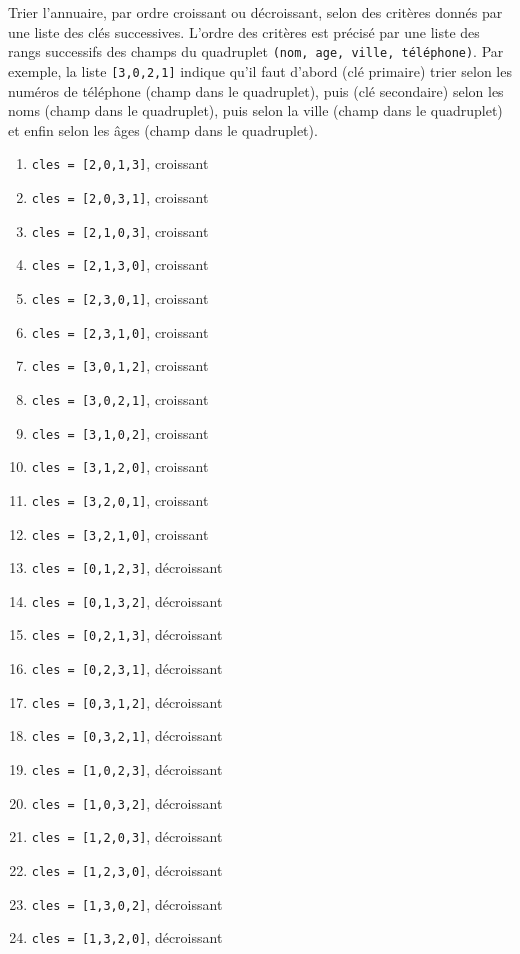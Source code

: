 Trier l'annuaire, par ordre croissant ou décroissant, selon des critères donnés 
par une liste des clés successives. 
L'ordre des critères est précisé par une liste des rangs successifs des champs du quadruplet
\texttt{(nom, age, ville, téléphone)}. Par exemple, la liste \texttt{[3,0,2,1]} indique
qu'il faut d'abord (clé primaire) trier selon les numéros de téléphone (champ  dans le quadruplet), puis (clé secondaire) selon les noms (champ  dans le quadruplet), 
puis selon la ville (champ  dans le quadruplet) et enfin selon les âges 
(champ  dans le quadruplet).

\noindent
\begin{minipage}[t]{7cm}
\begin{enumerate}
\item \texttt{cles = [2,0,1,3]}, croissant
\item \texttt{cles = [2,0,3,1]}, croissant
\item \texttt{cles = [2,1,0,3]}, croissant
\item \texttt{cles = [2,1,3,0]}, croissant
\item \texttt{cles = [2,3,0,1]}, croissant
\item \texttt{cles = [2,3,1,0]}, croissant
\item \texttt{cles = [3,0,1,2]}, croissant
\item \texttt{cles = [3,0,2,1]}, croissant
\item \texttt{cles = [3,1,0,2]}, croissant
\item \texttt{cles = [3,1,2,0]}, croissant
\item \texttt{cles = [3,2,0,1]}, croissant
\item \texttt{cles = [3,2,1,0]}, croissant
\end{enumerate}
\end{minipage}
\hfill
\begin{minipage}[t]{7cm}
\begin{enumerate}\setcounter{enumi}{12}
\item \texttt{cles = [0,1,2,3]}, décroissant
\item \texttt{cles = [0,1,3,2]}, décroissant
\item \texttt{cles = [0,2,1,3]}, décroissant
\item \texttt{cles = [0,2,3,1]}, décroissant
\item \texttt{cles = [0,3,1,2]}, décroissant
\item \texttt{cles = [0,3,2,1]}, décroissant
\item \texttt{cles = [1,0,2,3]}, décroissant
\item \texttt{cles = [1,0,3,2]}, décroissant
\item \texttt{cles = [1,2,0,3]}, décroissant
\item \texttt{cles = [1,2,3,0]}, décroissant
\item \texttt{cles = [1,3,0,2]}, décroissant
\item \texttt{cles = [1,3,2,0]}, décroissant
\end{enumerate}
\end{minipage}


